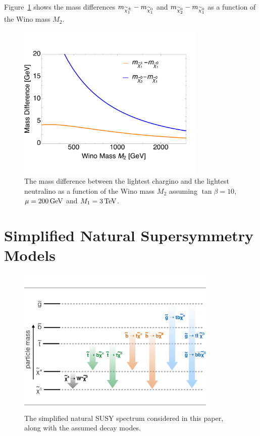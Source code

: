 Figure~\ref{fig:neutralinos} shows the mass differences
$m_{\widetilde{\chi}^{\pm}_1}-m_{\widetilde{\chi}^{0}_1}$ and $m_{\widetilde{\chi}^{0}_2}-m_{\widetilde{\chi}^{0}_1}$ as a function of the Wino mass $M_2$.


\begin{figure}[tb!]
\centering
\includegraphics[width=0.8\textwidth,clip=true,viewport= 0 30 610 450]{figs/theory/neutralinos.pdf}
\caption{The mass difference between the lightest chargino and the
  lightest neutralino as a function of the Wino mass $M_2$
  assuming $\tan\beta=10$, $\mu=200 \,\text{Ge\hspace{-.08em}V}$ and $M_1 = 3 \,\text{Te\hspace{-.08em}V}$.\label{fig:neutralinos}}
\end{figure}

\section{Simplified Natural Supersymmetry Models}
\label{sec:sms}

\begin{figure}[htb!]
\centering
\includegraphics[width=0.85\textwidth]{figs/analysis8TeV/naturalSpectrum.pdf}
\caption{\label{fig:spectrum} The simplified natural SUSY spectrum
  considered in this paper, along with the assumed decay modes.}
\end{figure}

